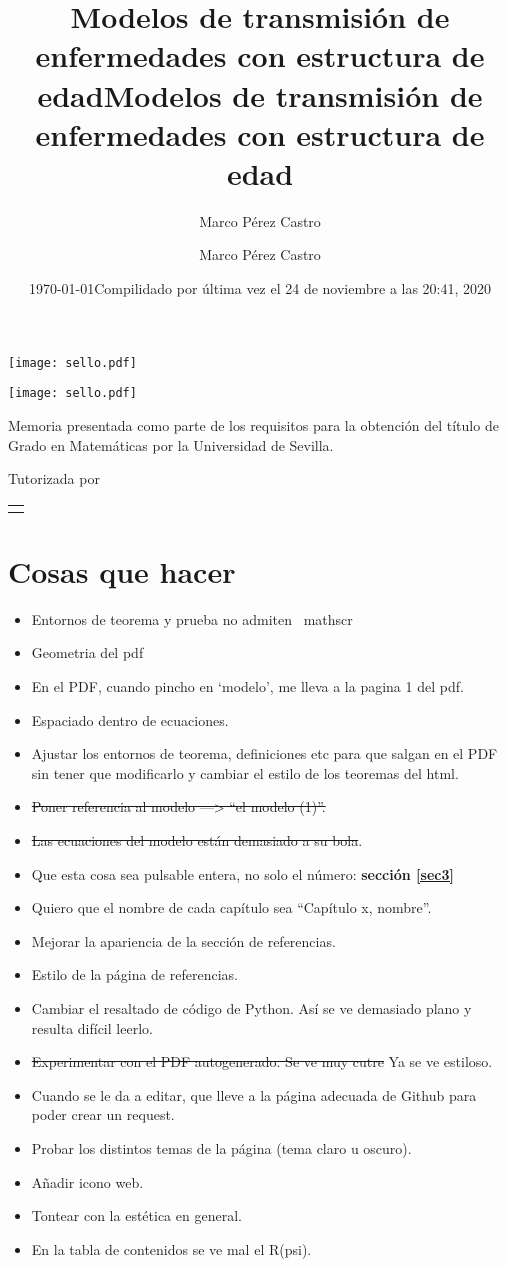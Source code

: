 \documentclass[
]{book}
\title{Modelos de transmisión de enfermedades con estructura de edad}
\author{Marco Pérez Castro}
\date{\today}
\title{Modelos de transmisión de enfermedades con estructura de edad}
\author{Marco Pérez Castro}
\date{Compilidado por última vez el 24 de noviembre a las 20:41, 2020}
\makeatletter
\providecommand{\tightlist}{%
  \setlength{\itemsep}{0pt}\setlength{\parskip}{0pt}}
\renewcommand\maketitle{%
  \begin{titlepage}
      \vspace*{1.5cm}
      \parskip=0pt
      \Huge\bfseries
      \begin{center}
          \leavevmode\texttt{[image: sello.pdf]}\\[2cm]
          \@title
      \end{center}
      \vspace{1cm}
      \begin{center}
          \@author
      \end{center}
  \end{titlepage}
  
  \begin{titlepage}
  \parindent=0pt
  \begin{flushleft}
  \vspace*{1.5mm}
  \setlength\baselineskip{0pt}
  \setlength\parskip{0mm}
  \begin{center}
      \leavevmode\texttt{[image: sello.pdf]}
  \end{center}
  \end{flushleft}
  \vspace{1cm}
  \bgroup
  \Large \bfseries
  \begin{center}
  \@title
  \end{center}
  \egroup
  \vspace*{.5cm}
  \begin{center}
  \@author
  \end{center}
  \vspace*{1.8cm}
  \begin{flushright}
  \begin{minipage}{8.45cm}
      Memoria presentada como parte de los requisitos para la obtención del título de
      Grado en Matemáticas por la Universidad de Sevilla.

      \vspace*{7.5mm}

      Tutorizada por
  \end{minipage}\par
  \begin{tabularx}{8.45cm}[b]{@{}l}
      \guardatutores
  \end{tabularx}
   \end{flushright}
      \vspace*{\fill}
   \end{titlepage}
   \pagestyle{tfg}
   \renewcommand{\chaptermark}[1]{\markright{\thechapter.\space ##1}}
   \renewcommand{\sectionmark}[1]{}
   \renewcommand{\subsectionmark}[1]{}
  }
\makeatother
\begin{document}
\maketitle

{
\setcounter{tocdepth}{1}
\tableofcontents
}
\hypertarget{hacer}{%
\chapter*{Cosas que hacer}\label{hacer}}

\begin{itemize}
\tightlist
\item
  Entornos de teorema y prueba no admiten ~mathscr
\item
  Geometria del pdf
\item
  En el PDF, cuando pincho en `modelo', me lleva a la pagina 1 del pdf.
\item
  Espaciado dentro de ecuaciones.
\item
  Ajustar los entornos de teorema, definiciones etc para que salgan en el PDF sin tener que modificarlo y cambiar el estilo de los teoremas del html.
\item
  \sout{Poner referencia al modelo ---\textgreater{} ``el modelo (1)''.}
\item
  \sout{Las ecuaciones del modelo están demasiado a su bola}.
\item
  Que esta cosa sea pulsable entera, no solo el número: \textbf{sección \ref{sec3}}
\item
  Quiero que el nombre de cada capítulo sea ``Capítulo x, nombre''.
\item
  Mejorar la apariencia de la sección de referencias.
\item
  Estilo de la página de referencias.
\item
  Cambiar el resaltado de código de Python. Así se ve demasiado plano y resulta difícil leerlo.
\item
  \sout{Experimentar con el PDF autogenerado. Se ve muy cutre} Ya se ve estiloso.
\item
  Cuando se le da a editar, que lleve a la página adecuada de Github para poder crear un request.
\item
  Probar los distintos temas de la página (tema claro u oscuro).
\item
  Añadir icono web.
\item
  Tontear con la estética en general.
\item
  En la tabla de contenidos se ve mal el R(psi).
\end{itemize}
\end{document}
